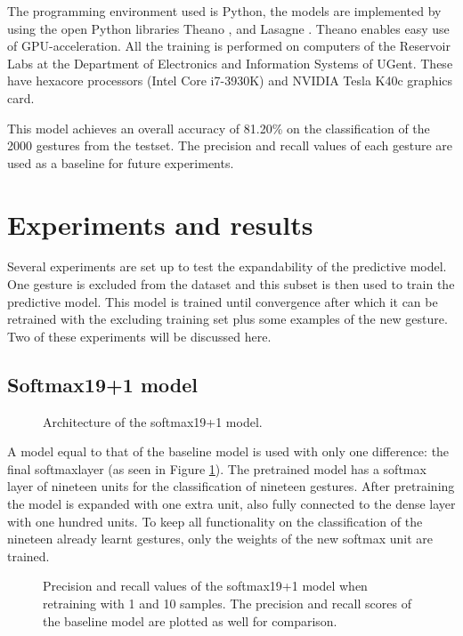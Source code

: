 \documentclass[twocolumn]{phdsymp} %
\begin{document}
The programming environment used is Python, the models are implemented by using the open Python libraries Theano \cite{theano}, and Lasagne \cite{lasagne}. Theano enables easy use of GPU-acceleration. All the training is performed on computers of the Reservoir Labs at the Department of Electronics and Information Systems of UGent. These have hexacore processors (Intel Core i7-3930K) and NVIDIA Tesla K40c graphics card.

This model achieves an overall accuracy of 81.20\% on the classification of the 2000 gestures from the testset. The precision and recall values of each gesture are used as a baseline for future experiments.
\section{Experiments and results}
Several experiments are set up to test the expandability of the predictive model. One gesture is excluded from the dataset and this subset is then used to train the predictive model. This model is trained until convergence after which it can be retrained with the excluding training set plus some examples of the new gesture. Two of these experiments will be discussed here.

\subsection{Softmax19+1 model}
\begin{figure}
	\centering
	\def\svgwidth{0.6\columnwidth}
	
	\caption{Architecture of the softmax19+1 model.}\label{fig:19x1-model}
\end{figure}
A model equal to that of the baseline model is used with only one difference: the final softmaxlayer (as seen in Figure \ref{fig:19x1-model}). The pretrained model has a softmax layer of nineteen units for the classification of nineteen gestures. After pretraining the model is expanded with one extra unit, also fully connected to the dense layer with one hundred units. To keep all functionality on the classification of the nineteen already learnt gestures, only the weights of the new softmax unit are trained.

\begin{figure}
	\def\svgwidth{\columnwidth}
	
	\caption{Precision and recall values of the softmax19+1 model when retraining with 1 and 10 samples. The precision and recall scores of the baseline model are plotted as well for comparison.}\label{fig:19x1}
\end{figure}
\end{document}
